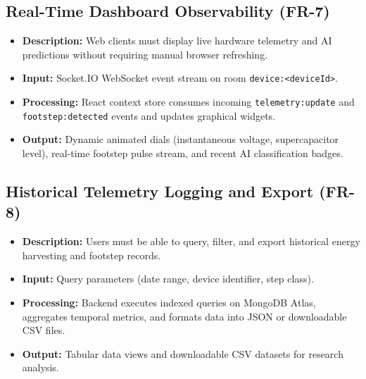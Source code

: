 \subsection{Real-Time Dashboard Observability (FR-7)}
\begin{itemize}
    \item \textbf{Description:} Web clients must display live hardware telemetry and AI predictions without requiring manual browser refreshing.
    \item \textbf{Input:} Socket.IO WebSocket event stream on room \texttt{device:<deviceId>}.
    \item \textbf{Processing:} React context store consumes incoming \texttt{telemetry:update} and \texttt{footstep:detected} events and updates graphical widgets.
    \item \textbf{Output:} Dynamic animated dials (instantaneous voltage, supercapacitor level), real-time footstep pulse stream, and recent AI classification badges.
\end{itemize}

\subsection{Historical Telemetry Logging and Export (FR-8)}
\begin{itemize}
    \item \textbf{Description:} Users must be able to query, filter, and export historical energy harvesting and footstep records.
    \item \textbf{Input:} Query parameters (date range, device identifier, step class).
    \item \textbf{Processing:} Backend executes indexed queries on MongoDB Atlas, aggregates temporal metrics, and formats data into JSON or downloadable CSV files.
    \item \textbf{Output:} Tabular data views and downloadable CSV datasets for research analysis.
\end{itemize}

